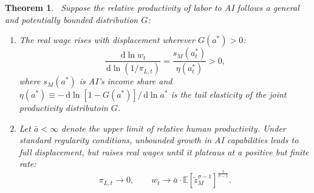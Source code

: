 \documentclass[11pt]{article}
\newtheorem{theorem}{Theorem}
\begin{document}
\begin{theorem}\label{prop:general-displacement}
~Suppose the relative
productivity of labor to AI follows a general and potentially bounded
distribution $G$: \begin{enumerate}
\item[(i)] The real wage rises with displacement wherever $G(a^{*})>0$:
\begin{equation}
\frac{\,\mathrm{d}\ln w_{t}}{\,\mathrm{d}\ln(1/\pi_{L,t})}=\frac{s_{M}(a^{*}_{t})}{\eta(a^{*}_{t})}>0,\label{eq:general-elasticity-main}
\end{equation}
where $s_{M}(a^{*})$ is AI's income share and $\eta(a^{*})\equiv-\,\mathrm{d}\ln[1-G(a^{*})]/\,\mathrm{d}\ln a^{*}$
is the tail elasticity of the joint productivity distributoin $G$.

\item[(ii)] Let $\bar{a}<\infty$ denote the upper limit of relative
human productivity. Under standard regularity conditions, unbounded
growth in AI capabilities leads to full displacement, but raises real
wages until it plateaus at a positive but finite rate:
\begin{equation}
\pi_{L,t}\to0,\qquad w_{t}\longrightarrow\bar{a}\cdot\mathbb{E}[\tilde{z}^{\sigma-1}_{M}]^{\frac{1}{\sigma-1}}.\label{eq:general-plateau-main}
\end{equation}
\end{enumerate}
\end{theorem}

\renewcommand{\thetheorem}{\arabic{theorem}}
\def\theHtheorem{\arabic{theorem}}
\end{document}
